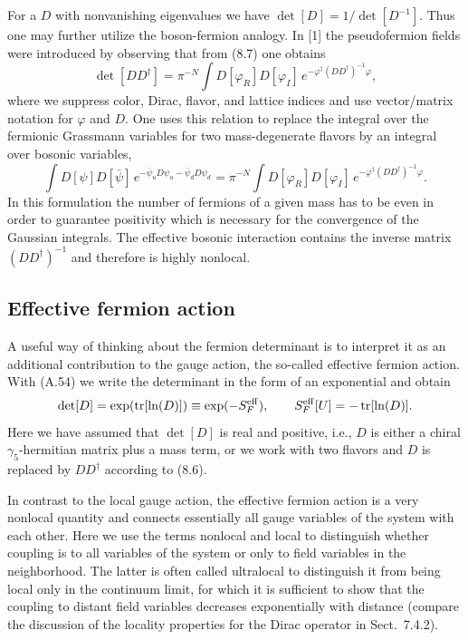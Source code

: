 For a $D$ with nonvanishing eigenvalues we have
$\det[D] = 1/\det[D^{-1}]$. Thus one may further utilize the boson-fermion
analogy. In [1] the pseudofermion fields were introduced by observing that from
(8.7) one obtains
\begin{equation}
\det[DD^\dagger] = \pi^{-N}\int D[\varphi_R]D[\varphi_I]\,e^{-\varphi^\dagger(DD^\dagger)^{-1}\varphi},
\end{equation}
where we suppress color, Dirac, flavor, and lattice indices and use
vector/matrix notation for $\varphi$ and $D$. One uses this relation to replace
the integral over the fermionic Grassmann variables for two mass-degenerate
flavors by an integral over bosonic variables,
\begin{equation}
\int D[\psi]D[\bar{\psi}]\,e^{-\bar{\psi}_u D\psi_u - \bar{\psi}_d D\psi_d}
= \pi^{-N}\int D[\varphi_R]D[\varphi_I]\,e^{-\varphi^\dagger(DD^\dagger)^{-1}\varphi}.
\end{equation}
In this formulation the number of fermions of a given mass has to be even in
order to guarantee positivity which is necessary for the convergence of the
Gaussian integrals. The effective bosonic interaction contains the inverse
matrix $(DD^\dagger)^{-1}$ and therefore is highly nonlocal.

\subsection{Effective fermion action}

A useful way of thinking about the fermion determinant is to interpret it as an
additional contribution to the gauge action, the so-called effective fermion
action. With (A.54) we write the determinant in the form of an exponential and
obtain
\begin{equation}
\det[D] = \exp(\operatorname{tr}[\ln(D)]) \equiv \exp(-S_F^{\mathrm{eff}}), \qquad
S_F^{\mathrm{eff}}[U] = -\operatorname{tr}[\ln(D)].
\end{equation}
Here we have assumed that $\det[D]$ is real and positive, i.e., $D$ is either a
chiral $\gamma_5$-hermitian matrix plus a mass term, or we work with two
flavors and $D$ is replaced by $DD^\dagger$ according to (8.6).

In contrast to the local gauge action, the effective fermion action is a very
nonlocal quantity and connects essentially all gauge variables of the system
with each other. Here we use the terms nonlocal and local to distinguish
whether coupling is to all variables of the system or only to field variables
in the neighborhood. The latter is often called ultralocal to distinguish it
from being local only in the continuum limit, for which it is sufficient to
show that the coupling to distant field variables decreases exponentially with
distance (compare the discussion of the locality properties for the Dirac
operator in Sect.~7.4.2).

